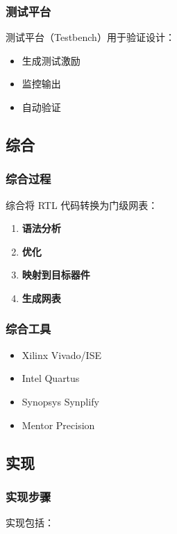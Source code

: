 \subsubsection{测试平台}

测试平台（Testbench）用于验证设计：
\begin{itemize}
  \item 生成测试激励
  \item 监控输出
  \item 自动验证
\end{itemize}

\subsection{综合}

\subsubsection{综合过程}

综合将 RTL 代码转换为门级网表：
\begin{enumerate}
  \item \textbf{语法分析}
  \item \textbf{优化}
  \item \textbf{映射到目标器件}
  \item \textbf{生成网表}
\end{enumerate}

\subsubsection{综合工具}

\begin{itemize}
  \item Xilinx Vivado/ISE
  \item Intel Quartus
  \item Synopsys Synplify
  \item Mentor Precision
\end{itemize}

\subsection{实现}

\subsubsection{实现步骤}

实现包括：

